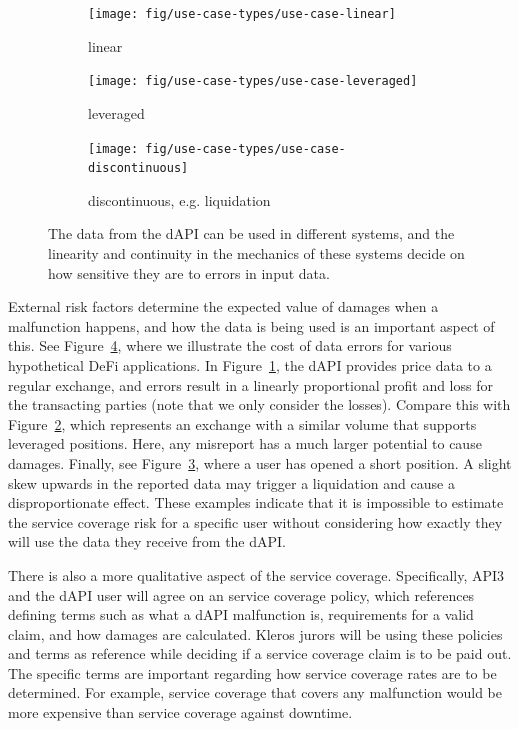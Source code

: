 \documentclass[11pt]{article}
\begin{document}
\begin{figure}[!t]
     \centering
     \begin{subfigure}{0.38\textwidth}
         \centering
         \texttt{[image: fig/use-case-types/use-case-linear]}
         \caption{linear}
         \label{fig:use-case-linear}
     \end{subfigure}
     
     \begin{subfigure}{0.38\textwidth}
         \centering
         \texttt{[image: fig/use-case-types/use-case-leveraged]}
         \caption{leveraged}
         \label{fig:use-case-leveraged}
     \end{subfigure}
     \begin{subfigure}{0.38\textwidth}
         \centering
         \texttt{[image: fig/use-case-types/use-case-discontinuous]}
         \caption{discontinuous, e.g. liquidation}
         \label{fig:use-case-discontinuous}
     \end{subfigure}
    \caption{The data from the dAPI can be used in different systems, and the linearity and continuity in the mechanics of these systems decide on how sensitive they are to errors in input data.}
    \label{fig:use-case-types}
\end{figure}

External risk factors determine the expected value of damages when a malfunction happens, and how the data is being used is an important aspect of this.
See Figure~\ref{fig:use-case-types}, where we illustrate the cost of data errors for various hypothetical DeFi applications.
In Figure~\ref{fig:use-case-linear}, the dAPI provides price data to a regular exchange, and errors result in a linearly proportional profit and loss for the transacting parties (note that we only consider the losses).
Compare this with Figure~\ref{fig:use-case-leveraged}, which represents an exchange with a similar volume that supports leveraged positions.
Here, any misreport has a much larger potential to cause damages.
Finally, see Figure~\ref{fig:use-case-discontinuous}, where a user has opened a short position.
A slight skew upwards in the reported data may trigger a liquidation and cause a disproportionate effect.
These examples indicate that it is impossible to estimate the service coverage risk for a specific user without considering how exactly they will use the data they receive from the dAPI.

There is also a more qualitative aspect of the service coverage.
Specifically, API3 and the dAPI user will agree on an service coverage policy, which references defining terms such as what a dAPI malfunction is, requirements for a valid claim, and how damages are calculated.
Kleros jurors will be using these policies and terms as reference while deciding if a service coverage claim is to be paid out.
The specific terms are important regarding how service coverage rates are to be determined.
For example, service coverage that covers any malfunction would be more expensive than service coverage against downtime.
\end{document}
